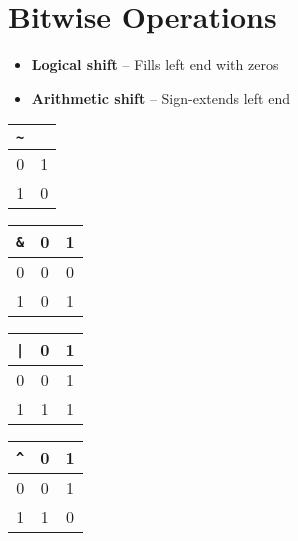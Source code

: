 \documentclass[twocolumn]{article}
\renewcommand{\tt}[1]{\texttt{#1}}
\begin{document}
\section{Bitwise Operations}
\begin{itemize}[noitemsep]
\item \textbf{Logical shift} -- Fills left end with zeros
\item \textbf{Arithmetic shift} -- Sign-extends left end
\end{itemize}

\begin{multicols}{4}
\begin{tabular}{r | c}
    \tt{\~} & \\ \hline
    0 & 1 \\
    1 & 0
\end{tabular}
\begin{tabular}{r | c c}
    \tt{\&} & 0 & 1 \\ \hline
    0 & 0 & 0 \\
    1 & 0 & 1
\end{tabular}
\begin{tabular}{r | c c}
    \tt{|} & 0 & 1 \\ \hline
    0 & 0 & 1 \\
    1 & 1 & 1
\end{tabular}
\begin{tabular}{r | c c}
    \tt{\^} & 0 & 1 \\ \hline
    0 & 0 & 1 \\
    1 & 1 & 0
\end{tabular}
\end{multicols}

\vfill
\end{document}
